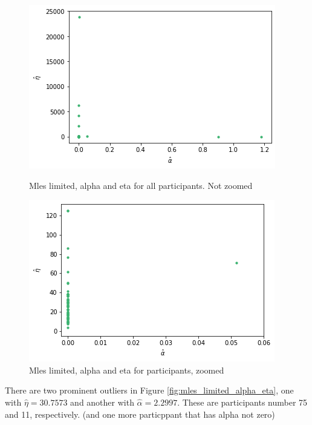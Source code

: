 \begin{figure}
    \centering
    \begin{minipage}{0.48\textwidth}
        \centering
        \includegraphics[scale=0.38]{pictures/plotted_mles_limited_alpha_eta_gk1.png}
        \caption{Mles limited, alpha and eta for all participants. Not zoomed}
        \label{fig:mles_limited_alpha_eta}
    \end{minipage}\hfill
    \begin{minipage}{0.48\textwidth}
        \centering
        \includegraphics[scale=0.38]{pictures/plotted_mles_limited_alpha_eta_gk1_zoomed.png}
        \caption{Mles limited, alpha and eta for participants, zoomed}
        \label{fig:mles_limited_alpha_eta_zoomed}
    \end{minipage}
\end{figure}

There are two prominent outliers in Figure \ref{fig:mles_limited_alpha_eta}, one with $\hat{\eta}=30.7573$ and another with $\hat{\alpha}=2.2997$. These are participants number 75 and 11, respectively. (and one more particppant that has alpha not zero)

